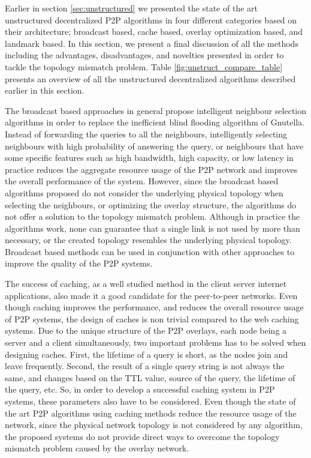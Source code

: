 \documentclass[acmcsur]{acmtrans2m}
\begin{document}
Earlier in section \ref{sec:unstructured} we presented the state of the art unstructured
decentralized P2P algorithms in four different categories based on their
architecture; broadcast based, cache based, overlay optimization based, and
landmark based. In this section, we present a final discussion of all the
methods including the advantages, disadvantages,
and novelties presented in order to tackle the topology mismatch problem.
Table \ref{fig:unstruct_compare_table} presents an overview of all the
unstructured decentralized algorithms described earlier in this section.

The broadcast based approaches in general propose intelligent neighbour
selection algorithms in order to replace the inefficient blind
flooding algorithm of Gnutella.
Instead of forwarding the queries to all the neighbours, intelligently selecting
neighbours with high probability of answering the query, or neighbours that have
some specific features such as high bandwidth, high capacity, or low latency in
practice reduces the aggregate resource usage of the P2P network and improves
the overall performance of the system. However, since the broadcast based algorithms
proposed do not consider the underlying physical topology when selecting the
neighbours, or optimizing the overlay structure, the algorithms do not offer a
solution to the topology mismatch problem. Although in practice the algorithms
work, none can guarantee that a single link is not used by more than necessary,
or the created topology resembles the underlying physical topology. Broadcast
based methods can be used in conjunction with other approaches to improve the
quality of the P2P systems.

The success of caching, as a well studied method in the client server internet
applications, also made it a good candidate for the peer-to-peer networks. Even
though caching improves the performance, and reduces the overall resource usage
of P2P systems, the design of caches is non trivial compared to the web caching
systems. Due to the unique structure of the P2P overlays, each node being a
server and a client simultaneously, two important problems has to be solved when
designing caches. First, the lifetime of a query is short, as the nodes join and
leave frequently. Second, the result of a single query string is not always the
same, and changes based on the TTL value, source of the query, the lifetime of
the query, etc. So, in order to develop a successful caching system in P2P
systems, these parameters also have to be considered. Even though the state of
the art P2P algorithms using caching methods reduce the resource usage of the
network, since the physical network topology is not considered by any algorithm,
the proposed systems do not provide direct ways to overcome the topology
mismatch problem caused by the overlay network.
\end{document}
